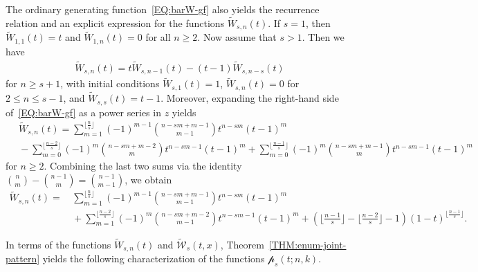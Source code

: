 \documentclass[11pt]{article}
\numberwithin{equation}{section}
\def\cW{\mathcal{W}}
\newcommand{\cp}{\mathcal{p}}
\begin{document}
The ordinary generating function~\eqref{EQ:barW-gf} also yields the recurrence relation and an explicit expression for the functions $\tilde{W}_{s,n}(t)$. If $s=1$, then $\tilde{W}_{1,1}(t)=t$ and $\tilde{W}_{1,n}(t)=0$ for all $n\geq2$. Now assume that $s>1$. Then we have
\begin{align}\label{EQ:barW-rr}
\tilde{W}_{s,n}(t)=t\tilde{W}_{s,n-1}(t)-(t-1)\tilde{W}_{s,n-s}(t)
\end{align}
for $n\geq s+1$, with initial conditions $\tilde{W}_{s,1}(t)=1$, $\tilde{W}_{s,n}(t)=0$ for $2\leq n \leq s-1$, and $\tilde{W}_{s,s}(t)=t-1$. Moreover, expanding the right-hand side of~\eqref{EQ:barW-gf} as a power series in $z$ yields
\begin{align*}
&\,\tilde{W}_{s,n}(t)=\sum_{m=1}^{\lfloor \frac{n}{s}\rfloor}(-1)^{m-1}\binom{n-sm+m-1}{m-1}t^{n-sm}(t-1)^m\\
&\,-\sum_{m=0}^{\lfloor \frac{n-2}{s}\rfloor}(-1)^{m}\binom{n-sm+m-2}{m}t^{n-sm-1}(t-1)^m
+\sum_{m=0}^{\lfloor \frac{n-1}{s}\rfloor}(-1)^{m}\binom{n-sm+m-1}{m}t^{n-sm-1}(t-1)^m
\end{align*}
for $n\geq2$. Combining the last two sums via the identity $\binom{n}{m}-\binom{n-1}{m}=\binom{n-1}{m-1}$, we obtain
\begin{align*}
\tilde{W}_{s,n}(t)=&\,\sum_{m=1}^{\lfloor \frac{n}{s}\rfloor}(-1)^{m-1}\binom{n-sm+m-1}{m-1}t^{n-sm}(t-1)^m\\
&\,+\sum_{m=1}^{\lfloor \frac{n-2}{s}\rfloor}(-1)^{m}\binom{n-sm+m-2}{m-1}t^{n-sm-1}(t-1)^m
+ \left(\lfloor \frac{n-1}{s}\rfloor-\lfloor \frac{n-2}{s}\rfloor-1\right)(1-t)^{\lfloor \frac{n-1}{s}\rfloor}.
\end{align*}

In terms of the functions $\tilde{W}_{s,n}(t)$ and $\tilde{\cW}_s(t,x)$, Theorem~\ref{THM:enum-joint-pattern} yields the following characterization of the functions $\cp_s(t;n,k)$.
\end{document}
